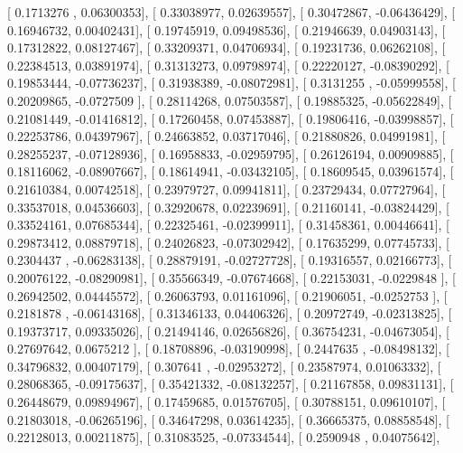 \documentclass{article}
\begin{document}
       [ 0.1713276 ,  0.06300353],
       [ 0.33038977,  0.02639557],
       [ 0.30472867, -0.06436429],
       [ 0.16946732,  0.00402431],
       [ 0.19745919,  0.09498536],
       [ 0.21946639,  0.04903143],
       [ 0.17312822,  0.08127467],
       [ 0.33209371,  0.04706934],
       [ 0.19231736,  0.06262108],
       [ 0.22384513,  0.03891974],
       [ 0.31313273,  0.09798974],
       [ 0.22220127, -0.08390292],
       [ 0.19853444, -0.07736237],
       [ 0.31938389, -0.08072981],
       [ 0.3131255 , -0.05999558],
       [ 0.20209865, -0.0727509 ],
       [ 0.28114268,  0.07503587],
       [ 0.19885325, -0.05622849],
       [ 0.21081449, -0.01416812],
       [ 0.17260458,  0.07453887],
       [ 0.19806416, -0.03998857],
       [ 0.22253786,  0.04397967],
       [ 0.24663852,  0.03717046],
       [ 0.21880826,  0.04991981],
       [ 0.28255237, -0.07128936],
       [ 0.16958833, -0.02959795],
       [ 0.26126194,  0.00909885],
       [ 0.18116062, -0.08907667],
       [ 0.18614941, -0.03432105],
       [ 0.18609545,  0.03961574],
       [ 0.21610384,  0.00742518],
       [ 0.23979727,  0.09941811],
       [ 0.23729434,  0.07727964],
       [ 0.33537018,  0.04536603],
       [ 0.32920678,  0.02239691],
       [ 0.21160141, -0.03824429],
       [ 0.33524161,  0.07685344],
       [ 0.22325461, -0.02399911],
       [ 0.31458361,  0.00446641],
       [ 0.29873412,  0.08879718],
       [ 0.24026823, -0.07302942],
       [ 0.17635299,  0.07745733],
       [ 0.2304437 , -0.06283138],
       [ 0.28879191, -0.02727728],
       [ 0.19316557,  0.02166773],
       [ 0.20076122, -0.08290981],
       [ 0.35566349, -0.07674668],
       [ 0.22153031, -0.0229848 ],
       [ 0.26942502,  0.04445572],
       [ 0.26063793,  0.01161096],
       [ 0.21906051, -0.0252753 ],
       [ 0.2181878 , -0.06143168],
       [ 0.31346133,  0.04406326],
       [ 0.20972749, -0.02313825],
       [ 0.19373717,  0.09335026],
       [ 0.21494146,  0.02656826],
       [ 0.36754231, -0.04673054],
       [ 0.27697642,  0.0675212 ],
       [ 0.18708896, -0.03190998],
       [ 0.2447635 , -0.08498132],
       [ 0.34796832,  0.00407179],
       [ 0.307641  , -0.02953272],
       [ 0.23587974,  0.01063332],
       [ 0.28068365, -0.09175637],
       [ 0.35421332, -0.08132257],
       [ 0.21167858,  0.09831131],
       [ 0.26448679,  0.09894967],
       [ 0.17459685,  0.01576705],
       [ 0.30788151,  0.09610107],
       [ 0.21803018, -0.06265196],
       [ 0.34647298,  0.03614235],
       [ 0.36665375,  0.08858548],
       [ 0.22128013,  0.00211875],
       [ 0.31083525, -0.07334544],
       [ 0.2590948 ,  0.04075642],
\end{document}
